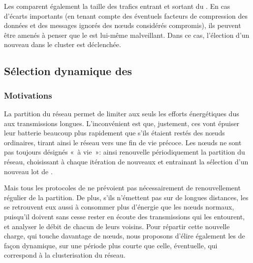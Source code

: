 Les \cns comparent également la taille des trafics entrant et sortant du \ch.
En cas d'écarts importants (en tenant compte des éventuels facteurs de compression des données et des messages ignorés des nœuds considérés compromis), ils peuvent être amenés à penser que le \ch est lui-même malveillant.
Dans ce cas, l'élection d'un nouveau \CH dans le cluster est déclenchée.

    \subsection{Sélection dynamique des \cns}

        \subsubsection{Motivations}
La partition du réseau permet de limiter aux seuls \chs les efforts énergétiques dus aux transmissions longues.
L'inconvénient est que, justement, ces \CH vont épuiser leur batterie beaucoup plus rapidement que s'ils étaient restés des nœuds ordinaires, tirant ainsi le réseau vers une fin de vie précoce.
Les nœuds ne sont pas toujours désignés \CH «~à vie~»: ainsi \leach renouvelle périodiquement la partition du réseau, choisissant à chaque itération de nouveaux \chs et entrainant la sélection d'un nouveau lot de \cns.

Mais tous les protocoles de  ne prévoient pas nécessairement de renouvellement régulier de la partition.
De plus, s'ils n'émettent pas sur de longues distances, les \cns se retrouvent eux aussi à consommer plus d'énergie que les nœuds normaux, puisqu'il doivent sans cesse rester en écoute des transmissions qui les entourent, et analyser le débit de chacun de leurs voisins.
Pour répartir cette nouvelle charge, qui touche davantage de nœuds, nous proposons d'élire également les \cns de façon dynamique, sur une période plus courte que celle, éventuelle, qui correspond à la clusterisation du réseau.

